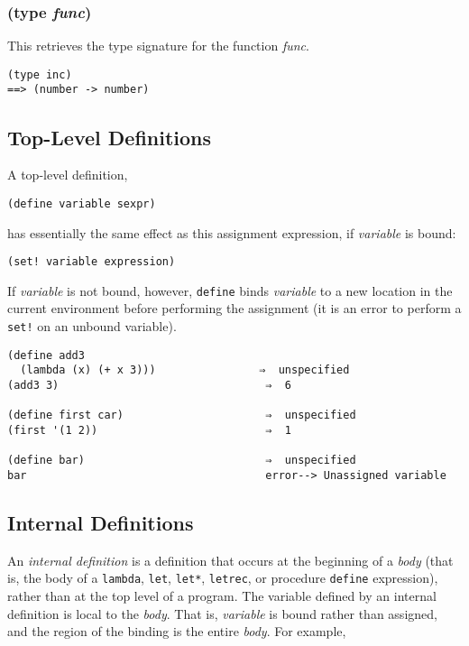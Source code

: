 \documentclass{article}
\begin{document}
\subsubsection{(type \emph{func})}
 
This retrieves the type signature for the function \emph{func}.

\begin{verbatim}
(type inc)
==> (number -> number)

\end{verbatim}

\subsection{Top-Level Definitions}\label{sec:top-level-definitions}

A top-level definition,

\begin{verbatim}
(define variable sexpr)
\end{verbatim}

has essentially the same effect as this assignment expression, if \emph{variable} is bound:

\begin{verbatim}
(set! variable expression)
\end{verbatim}

If \emph{variable} is not bound, however, \verb|define| binds \emph{variable} to a new
location in the current environment before performing the assignment (it is an error to
perform a \verb|set!| on an unbound variable).

\begin{verbatim}
(define add3
  (lambda (x) (+ x 3)))                ⇒  unspecified
(add3 3)                                ⇒  6

(define first car)                      ⇒  unspecified
(first '(1 2))                          ⇒  1

(define bar)                            ⇒  unspecified
bar                                     error--> Unassigned variable
\end{verbatim}

\subsection{Internal Definitions}\label{sec:internal-definitions}

An \emph{internal definition} is a definition that occurs at the beginning of a \emph{body}
(that is, the body of a \verb|lambda|, \verb|let|, \verb|let*|, \verb|letrec|, or
procedure \verb|define| expression), rather than at the top level of a program. The
variable defined by an internal definition is local to the \emph{body}. That is,
\emph{variable} is bound rather than assigned, and the region of the binding is the entire
\emph{body}. For example,
\end{document}
